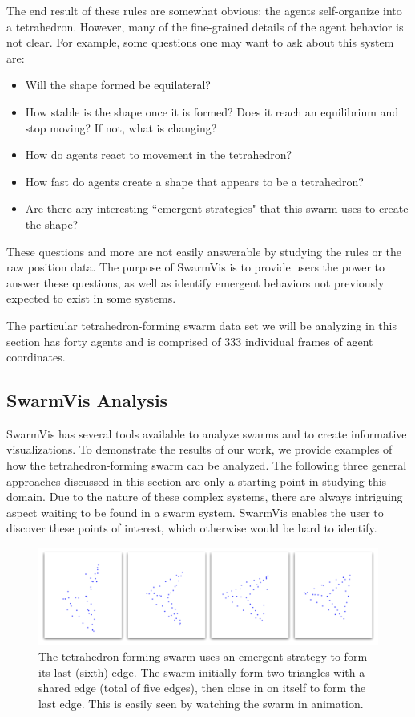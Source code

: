 \documentclass[conference]{IEEEtran}
\begin{document}
The end result of these rules are somewhat obvious: the agents self-organize into a tetrahedron.
However, many of the fine-grained details of the agent behavior is not clear.
For example, some questions one may want to ask about this system are: 
\begin{itemize}
\item Will the shape formed be equilateral?
\item How stable is the shape once it is formed? Does it reach an equilibrium and stop moving? If not, what is changing?
\item How do agents react to movement in the tetrahedron?
\item How fast do agents create a shape that appears to be a tetrahedron?
\item Are there any interesting ``emergent strategies" that this swarm uses to create the shape?
\end{itemize}
These questions and  more are not easily answerable by studying the rules or the raw position data.
The purpose of SwarmVis is to provide users the power to answer these questions,
as well as identify emergent behaviors not previously expected to exist in some systems.

The particular tetrahedron-forming swarm data set we will be analyzing in this section has forty agents
and is comprised of 333 individual frames of agent coordinates.

\subsection{SwarmVis Analysis}
SwarmVis has several tools available to analyze swarms and to create informative visualizations.
To demonstrate the results of our work, we provide examples of how the tetrahedron-forming swarm can be analyzed.
The following three general approaches discussed in this section are only a starting point in studying this domain.
Due to the nature of these complex systems, there are always intriguing aspect waiting to be found in a swarm system.
SwarmVis enables the user to discover these points of interest, which otherwise would be hard to identify.


\begin{figure}
\centering
\includegraphics[scale=.21]{images/tetraclosing.pdf}
\caption{
The tetrahedron-forming swarm uses an emergent strategy to form its last (sixth) edge.
The swarm initially form two triangles with a shared edge (total of five edges), then
close in on itself to form the last edge. This is easily seen by watching the swarm in animation.}
\label{TetraClosing}
\end{figure}
\end{document}
